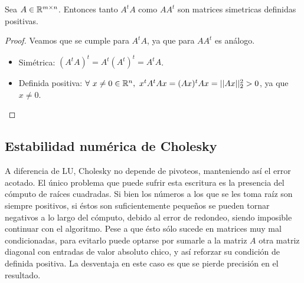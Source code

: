 \begin{propo}
	Sea $A \in\mathbb{R}^{m\times n}$. Entonces tanto $A^tA$ como $AA^t$ son matrices simetricas definidas positivas.

	\begin{proof} Veamos que se cumple para $A^tA$, ya que para $AA^t$ es análogo.
		\begin{itemize}
			\item Simétrica: $(A^tA)^t = A^t(A^t)^t = A^tA$.
			\item Definida positiva: $\forall\ x \neq 0 \in \mathbb{R}^{n},\ x^tA^tAx = (Ax)^tAx = ||Ax||_{2}^{2} > 0$, ya que $x \neq 0$.
		\end{itemize}
	\end{proof}
\end{propo}

\subsection{Estabilidad numérica de Cholesky}
A diferencia de LU, Cholesky no depende de pivoteos, manteniendo así el error acotado. El único problema que puede sufrir esta escritura es la presencia del cómputo de raíces cuadradas. Si bien los números a los que se les toma raíz son siempre positivos, si éstos son suficientemente pequeños se pueden tornar negativos a lo largo del cómputo, debido al error de redondeo, siendo imposible continuar con el algoritmo. Pese a que ésto sólo sucede en matrices muy mal condicionadas, para evitarlo puede optarse por sumarle a la matriz $A$ otra matriz diagonal con entradas de valor absoluto chico, y así reforzar su condición de definida positiva. La desventaja en este caso es que se pierde precisión en el resultado.
